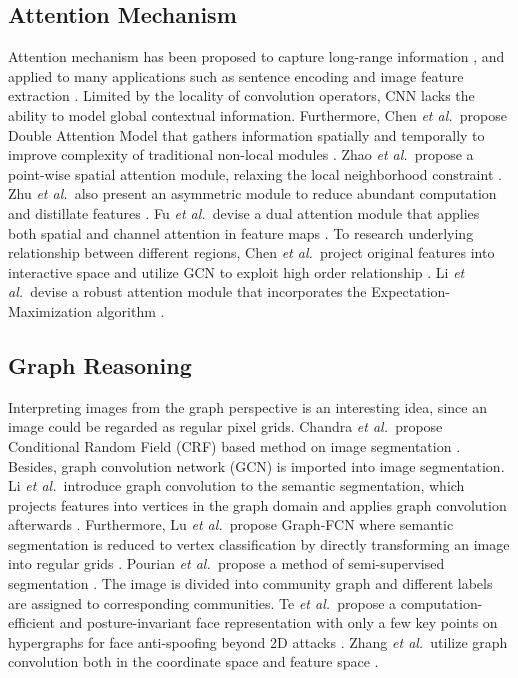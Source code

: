 \documentclass[runningheads]{llncs}
\def\et{{\it et al.~}}
\begin{document}
\subsection{Attention Mechanism}
Attention mechanism has been proposed to capture long-range information \cite{bahdanau2014neural}, and applied to many applications such as sentence encoding \cite{vaswani2017attention} and image feature extraction \cite{wang2018non}. Limited by the locality of convolution operators, CNN lacks the ability to model global contextual information. Furthermore, Chen \et propose Double Attention Model that gathers information spatially and temporally to improve complexity of traditional non-local modules \cite{chen20182}. Zhao \et propose a point-wise spatial attention module, relaxing the local neighborhood constraint \cite{zhao2018psanet}. Zhu \et also present an asymmetric module to reduce abundant computation and distillate features \cite{zhu2019asymmetric}. Fu \et devise a dual attention module that applies both spatial and channel attention in feature maps \cite{fu2019dual}. To research underlying relationship between different regions, Chen \et project original features into interactive space and utilize GCN to exploit high order relationship \cite{chen2019graph}. Li \et devise a robust attention module that incorporates the Expectation-Maximization algorithm \cite{li2019expectation}.

\subsection{Graph Reasoning}
Interpreting images from the graph perspective is an interesting idea, since an image could be regarded as regular pixel grids. Chandra \et propose Conditional Random Field (CRF) based method on image segmentation \cite{chandra2017dense}. Besides, graph convolution network (GCN) is imported into image segmentation. Li \et introduce graph convolution to the semantic segmentation, which projects features into vertices in the graph domain and applies graph convolution afterwards \cite{li2018beyond}. Furthermore, Lu \et propose Graph-FCN where semantic segmentation is reduced to vertex classification by directly transforming an image into regular grids \cite{lu2019graph}. Pourian \et propose a method of semi-supervised segmentation \cite{pourian2015weakly}. The image is divided into community graph and different labels are assigned to corresponding communities. 
Te \et propose a computation-efficient and posture-invariant face representation with only a few key points on hypergraphs for face anti-spoofing beyond 2D attacks \cite{te2020exploring}.  
Zhang \et utilize graph convolution both in the coordinate space and feature space \cite{zhang2019dual}. 
\end{document}
